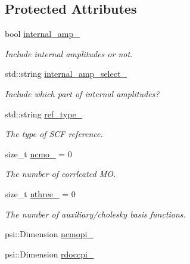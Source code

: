 \subsection*{Protected Attributes}
\begin{DoxyCompactItemize}
\item 
bool \mbox{\hyperlink{classforte_1_1_t_h_r_e_e___d_s_r_g___m_r_p_t2_af394598897ac71748c846a70a43f84c1}{internal\+\_\+amp\+\_\+}}
\begin{DoxyCompactList}\small\item\em Include internal amplitudes or not. \end{DoxyCompactList}\item 
std\+::string \mbox{\hyperlink{classforte_1_1_t_h_r_e_e___d_s_r_g___m_r_p_t2_a79226dc2ddd185e348c101712227896d}{internal\+\_\+amp\+\_\+select\+\_\+}}
\begin{DoxyCompactList}\small\item\em Include which part of internal amplitudes? \end{DoxyCompactList}\item 
std\+::string \mbox{\hyperlink{classforte_1_1_t_h_r_e_e___d_s_r_g___m_r_p_t2_acb31edf33c4c048c4f71fec0995e00f3}{ref\+\_\+type\+\_\+}}
\begin{DoxyCompactList}\small\item\em The type of S\+CF reference. \end{DoxyCompactList}\item 
size\+\_\+t \mbox{\hyperlink{classforte_1_1_t_h_r_e_e___d_s_r_g___m_r_p_t2_a3229ab54e6071ecc32ec13c1e67231ab}{ncmo\+\_\+}} = 0
\begin{DoxyCompactList}\small\item\em The number of corrleated MO. \end{DoxyCompactList}\item 
size\+\_\+t \mbox{\hyperlink{classforte_1_1_t_h_r_e_e___d_s_r_g___m_r_p_t2_a715e1300470852f71c000489dbfac104}{nthree\+\_\+}} = 0
\begin{DoxyCompactList}\small\item\em The number of auxiliary/cholesky basis functions. \end{DoxyCompactList}\item 
psi\+::\+Dimension \mbox{\hyperlink{classforte_1_1_t_h_r_e_e___d_s_r_g___m_r_p_t2_a3eb29b2153d4dd00fb4542a5897057d1}{ncmopi\+\_\+}}
\item 
psi\+::\+Dimension \mbox{\hyperlink{classforte_1_1_t_h_r_e_e___d_s_r_g___m_r_p_t2_a164d589bdf2a0fba94aa90b57851357d}{rdoccpi\+\_\+}}

\end{DoxyCompactItemize}

